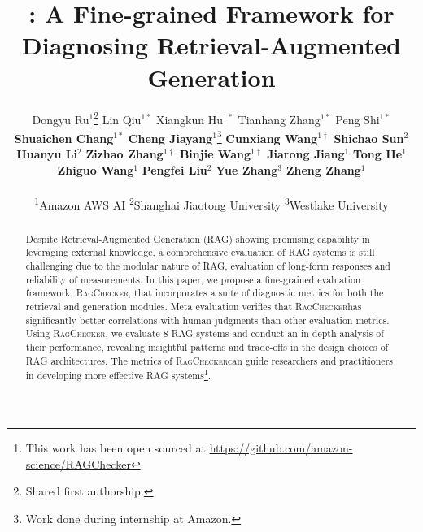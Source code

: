 \documentclass{article}
\title{\benchname: A Fine-grained Framework for Diagnosing Retrieval-Augmented Generation}
\author{
Dongyu Ru$^{1}$\thanks{Shared first authorship.} \quad
Lin Qiu$^{1*}$ \quad
Xiangkun Hu$^{1*}$ \quad
Tianhang Zhang$^{1*}$ \quad
Peng Shi$^{1*}$ \\
\textbf{Shuaichen Chang}$^{1*}$ \quad
\textbf{Cheng Jiayang}$^{1}$\thanks{Work done during internship at Amazon.} \quad 
\textbf{Cunxiang Wang}$^{1\dagger}$ \quad 
\textbf{Shichao Sun}$^{2}$ \\ 
\textbf{Huanyu Li}$^{2}$ \quad 
\textbf{Zizhao Zhang}$^{1\dagger}$ \quad 
\textbf{Binjie Wang}$^{1\dagger}$ \quad 
\textbf{Jiarong Jiang}$^{1}$ \quad 
\textbf{Tong He}$^{1}$ \\ 
\textbf{Zhiguo Wang}$^{1}$ \quad 
\textbf{Pengfei Liu}$^{2}$ \quad 
\textbf{Yue Zhang}$^{3}$ \quad 
\textbf{Zheng Zhang}$^{1}$\\\\
\textsuperscript{1}Amazon AWS AI\quad
\textsuperscript{2}Shanghai Jiaotong University\quad
\textsuperscript{3}Westlake University\\
}
\newcommand{\benchname}{\textsc{RagChecker}}
\begin{document}
\maketitle


\begin{abstract}
Despite Retrieval-Augmented Generation (RAG) showing promising capability in leveraging external knowledge, a comprehensive evaluation of RAG systems is still challenging due to the modular nature of RAG, evaluation of long-form responses and reliability of measurements. In this paper, we propose a fine-grained evaluation framework, \benchname, that incorporates a suite of diagnostic metrics for both the retrieval and generation modules. 
Meta evaluation verifies that \benchname\space has significantly better correlations with human judgments than other evaluation metrics.
Using \benchname, we evaluate 8 RAG systems and conduct an in-depth analysis of their performance, revealing insightful patterns and trade-offs in the design choices of RAG architectures. The metrics of \benchname\space can guide researchers and practitioners in developing more effective RAG systems\footnote{This work has been open sourced at \url{https://github.com/amazon-science/RAGChecker}}.
\end{abstract}





% 



\clearpage


% 
\end{document}
